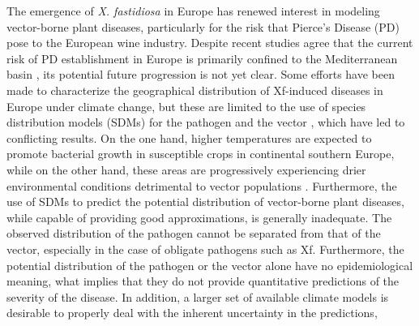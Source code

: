 The emergence of \textit{X. fastidiosa} in Europe has renewed interest in
modeling vector-borne plant diseases, particularly for the risk that Pierce's
Disease (PD) pose to the European wine industry. Despite recent studies agree
that the current risk of PD establishment in Europe is primarily confined to
the Mediterranean basin
\cite{Godefroid2019,Godefroid2022_vector,GimenezRomero2022_CommsBio},
its potential future progression is not yet clear. Some efforts have been made
to characterize the geographical distribution of Xf-induced diseases in Europe
under climate change, but these are limited to the use of species distribution
models (SDMs) for the pathogen \cite{Bosso2016b,Schneider2020,Godefroid2022}
and the vector \cite{Godefroid2022_vector}, which have led to conflicting
results. On the one hand, higher temperatures are expected to promote bacterial
growth in susceptible crops in continental southern Europe, while on the other
hand, these areas are progressively experiencing drier environmental conditions
detrimental to vector populations \cite{Godefroid2022_vector}. Furthermore, the
use of SDMs to predict the potential distribution of vector-borne plant
diseases, while capable of providing good approximations, is generally
inadequate. The observed distribution of the pathogen cannot be separated from
that of the vector, especially in the case of obligate pathogens such as Xf.
Furthermore, the potential distribution of the pathogen or the vector alone
have no epidemiological meaning, what implies that they do not provide
quantitative predictions of the severity of the disease. In addition, a larger
set of available climate models is desirable to properly deal with the inherent
uncertainty in the predictions,

